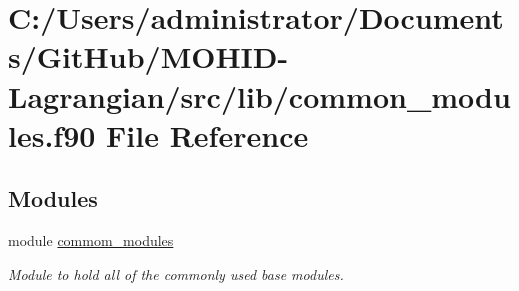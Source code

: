 \hypertarget{common__modules_8f90}{}\section{C\+:/\+Users/administrator/\+Documents/\+Git\+Hub/\+M\+O\+H\+I\+D-\/\+Lagrangian/src/lib/common\+\_\+modules.f90 File Reference}
\label{common__modules_8f90}
\subsection*{Modules}
\begin{DoxyCompactItemize}
\item 
module \mbox{\hyperlink{namespacecommom__modules}{commom\+\_\+modules}}
\begin{DoxyCompactList}\small\item\em Module to hold all of the commonly used base modules. \end{DoxyCompactList}\end{DoxyCompactItemize}
